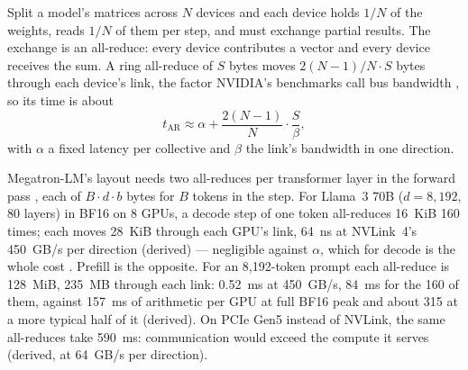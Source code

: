 

Split a model's matrices across $N$ devices and each device holds $1/N$ of the
weights, reads $1/N$ of them per step, and must exchange partial results. The
exchange is an all-reduce: every device contributes a vector and every device
receives the sum. A ring all-reduce of $S$ bytes moves $2(N-1)/N \cdot S$
bytes through each device's link, the factor NVIDIA's benchmarks call bus
bandwidth \cite{nccltests2026performance}, so its time is about
\begin{equation}
t_{\text{AR}} \approx \alpha + \frac{2(N-1)}{N}\cdot\frac{S}{\beta},
\label{eq:allreduce-time}
\end{equation}
with $\alpha$ a fixed latency per collective and $\beta$ the link's bandwidth in
one direction.

Megatron-LM's layout needs two all-reduces per transformer layer in the forward
pass \cite{shoeybi2019megatron}, each of $B \cdot d \cdot b$ bytes for $B$ tokens
in the step. For Llama~3 70B ($d = 8{,}192$, 80 layers) in BF16 on 8 GPUs, a
decode step of one token all-reduces 16~KiB 160 times; each moves 28~KiB
through each GPU's link, 64~ns at NVLink~4's 450~GB/s per direction (derived) ---
negligible against $\alpha$, which for decode is the whole cost
. Prefill is the opposite. For an 8,192-token prompt each
all-reduce is 128~MiB, 235~MB through each link: 0.52~ms at 450~GB/s, 84~ms for
the 160 of them, against 157~ms of arithmetic per GPU at full BF16 peak and
about 315 at a more typical half of it (derived). On PCIe Gen5 instead of
NVLink, the same all-reduces take 590~ms: communication would exceed the
compute it serves (derived, at 64~GB/s per direction).

